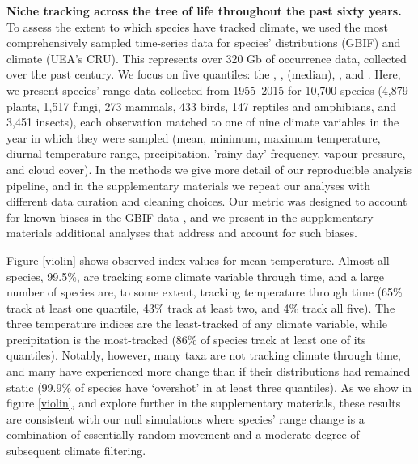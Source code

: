 \documentclass[12pt]{report}
\begin{document}
\textbf{Niche tracking across the tree of life throughout the past
  sixty years.} To assess the extent to which species have tracked
climate, we used the most comprehensively sampled time-series data for
species' distributions (GBIF\supercite{url_gbif}) and climate (UEA's
CRU\supercite{Harris2014}). This represents over 320 Gb of occurrence
data, collected over the past century.
We focus on five quantiles: the ,
,  (median), , and . Here, we present species' range data collected from 1955--2015 for 10,700 species (4,879 plants,
1,517 fungi, 273 mammals, 433 birds, 147 reptiles and amphibians, and
3,451 insects), each observation matched to one of nine climate
variables in the year in which they were sampled (mean, minimum,
maximum temperature, diurnal temperature range, precipitation, 'rainy-day'
frequency, vapour pressure, and cloud cover). In the methods we
give more detail of our reproducible analysis pipeline, and in the
supplementary materials we repeat our analyses with different data
curation and cleaning choices. Our metric was designed to account for known biases in the GBIF data \supercite{Beck2014}, and
we present in the supplementary materials additional analyses that
address and account for such biases.

Figure \ref{violin} shows observed index values for mean temperature.
Almost all species, 99.5\%, are tracking some climate variable through time, and a large number of
species are, to some extent, tracking temperature through time (65\%
track at least one quantile, 43\% track at least two, and 4\% track
all five). The three temperature indices are the least-tracked of any
climate variable, while precipitation is the most-tracked (86\% of
species track at least one of its quantiles). Notably, however, many
taxa are not tracking climate through time, and many have experienced
more change than if their distributions had remained static (99.9\% of
species have `overshot' in at least three quantiles). As we show in
figure \ref{violin}, and explore further in the supplementary
materials, these results are consistent with our null simulations
where species' range change is a combination of essentially random
movement and a moderate degree of subsequent climate filtering.
\end{document}
